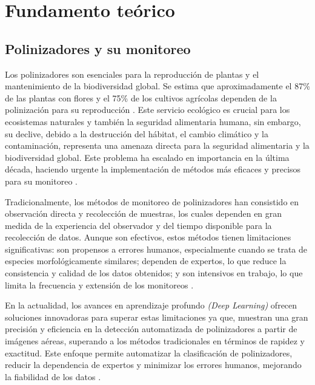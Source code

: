 \chapter{Fundamento teórico}

\section{Polinizadores y su monitoreo}

Los polinizadores son esenciales para la reproducción de plantas y el mantenimiento de la biodiversidad global. Se estima que aproximadamente el 87\% de las plantas con flores y el 75\% de los cultivos agrícolas dependen de la polinización para su reproducción \parencite{ghosh2025pollinator}. Este servicio ecológico es crucial para los ecosistemas naturales y también
la seguridad alimentaria humana, sin embargo, su declive, debido a la destrucción del hábitat, el cambio climático y la contaminación, representa una amenaza directa para la seguridad alimentaria y la biodiversidad global. Este problema ha escalado en importancia en la última década, haciendo urgente la implementación de métodos más eficaces y precisos para su monitoreo \parencite{hellwig2024pollinator}.

Tradicionalmente, los métodos de monitoreo de polinizadores han consistido en observación directa y recolección de muestras, los cuales dependen en gran medida de la experiencia del observador y del tiempo disponible para la recolección de datos. Aunque son efectivos, estos métodos tienen limitaciones significativas: son propensos a errores humanos,
especialmente cuando se trata de especies morfológicamente similares; dependen de expertos, lo que reduce la consistencia y calidad de los datos obtenidos; y son intensivos en trabajo, lo que limita la frecuencia y extensión de los monitoreos \parencite{batz2023forecasting}.

En la actualidad, los avances en aprendizaje profundo \textit{(Deep Learning)} ofrecen soluciones innovadoras para superar estas limitaciones ya que, muestran una gran precisión y eficiencia en la detección automatizada de polinizadores a partir de imágenes aéreas, superando a los métodos tradicionales en términos de rapidez y exactitud. Este enfoque permite automatizar la clasificación de polinizadores, reducir la dependencia de expertos y minimizar los errores humanos, mejorando la fiabilidad de los datos \parencite{wang2025insectreview}.

